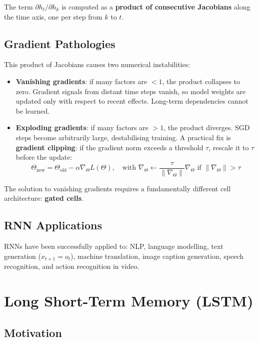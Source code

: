 \documentclass[11pt,a4paper]{article}
\theoremstyle{definition}
\theoremstyle{plain}
\theoremstyle{remark}
\begin{document}
The term $\partial h_t / \partial h_k$ is computed as a \textbf{product of consecutive Jacobians} along the time axis, one per step from $k$ to $t$.

\subsection{Gradient Pathologies}

This product of Jacobians causes two numerical instabilities:

\begin{itemize}
    \item \textbf{Vanishing gradients}: if many factors are $< 1$, the product collapses to zero. Gradient signals from distant time steps vanish, so model weights are updated only with respect to recent effects. Long-term dependencies cannot be learned.
    \item \textbf{Exploding gradients}: if many factors are $> 1$, the product diverges. SGD steps become arbitrarily large, destabilising training. A practical fix is \textbf{gradient clipping}: if the gradient norm exceeds a threshold $\tau$, rescale it to $\tau$ before the update:
    \[
        \Theta_{\mathrm{new}} = \Theta_{\mathrm{old}} - \alpha \nabla_\Theta L(\Theta),
        \quad \text{with } \nabla_\Theta \leftarrow \frac{\tau}{\|\nabla_\Theta\|}\nabla_\Theta \text{ if } \|\nabla_\Theta\| > \tau
    \]
\end{itemize}

The solution to vanishing gradients requires a fundamentally different cell architecture: \textbf{gated cells}.

\subsection{RNN Applications}

RNNs have been successfully applied to: NLP, language modelling, text generation ($x_{t+1} = o_t$), machine translation, image caption generation, speech recognition, and action recognition in video.


\section{Long Short-Term Memory (LSTM)}

\subsection{Motivation}
\end{document}
